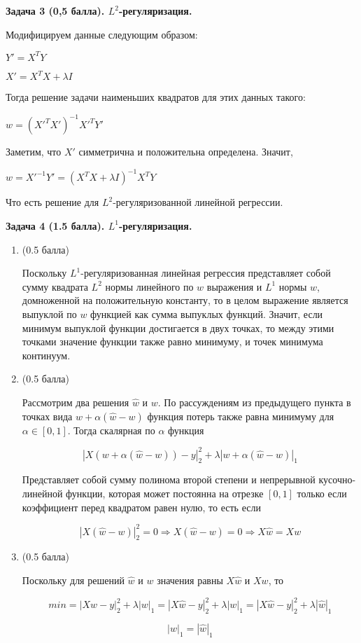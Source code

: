 \documentclass[10pt]{article}
\begin{document}
	
	
	\bigskip
	
	
	
	\textbf{Задача 3 (0,5 балла). $L^2$-регуляризация.}
	
	
	Модифицируем данные следующим образом: 
	
	\medskip
	$Y' = X^T Y$
	
	$X' = X^T X + \lambda I$
	
	\medskip	
	Тогда решение задачи наименьших квадратов для этих данных такого:
	
	$w = (X'^T X')^{-1}X'^T Y'$
	
	Заметим, что $X'$ симметрична и положительна определена. Значит,
	\medskip
	
	$w = X'^{-1}Y' = (X^T X + \lambda I)^{-1}X^T Y$
	
	\medskip
	Что есть решение для $L^2$-регуляризованной линейной регрессии.
	\bigskip
	
	
	\textbf{Задача 4 (1.5 балла). $L^1$-регуляризация.}
	
	
	\begin{enumerate}
		\item{(0.5 балла)} 
		
		Поскольку $L^1$-регуляризованная линейная регрессия представляет собой сумму квадрата $L^2$ нормы линейного по $w$ выражения и $L^1$ нормы $w$, домноженной на положительную константу, то в целом выражение является выпуклой по $w$ функцией как сумма выпуклых функций. Значит, если минимум выпуклой функции достигается в двух точках, то между этими точками значение функции также равно минимуму, и точек минимума континуум.
		
		\item{(0.5 балла)} 
		
		Рассмотрим два решения $\widehat{w}$ и $w$. По рассуждениям из предыдущего пункта в точках вида $w + \alpha(\widehat{w} - w)$ функция потерь также равна минимуму для $\alpha \in [0, 1]$. Тогда скалярная по $\alpha$ функция
		
		$$|X(w + \alpha(\widehat{w} - w)) -y |_2^2 + \lambda |w + \alpha(\widehat{w} - w)|_1$$
		
		Представляет собой сумму полинома второй степени и непрерывной кусочно-линейной функции, которая может постоянна на отрезке $[0,1]$ только если коэффициент перед квадратом равен нулю, то есть если
		
		$$|X(\widehat{w} - w)|^2_2 = 0 \Rightarrow X(\widehat{w} - w) = 0 \Rightarrow X\widehat{w} = Xw$$
		
		\item{(0.5 балла)} 
		
		Поскольку для решений $\widehat{w}$ и $w$ значения равны $X\widehat{w}$  и $Xw$, то
		
		$$ min = |Xw -y |_2^2 + \lambda |w|_1 = |X\widehat{w} -y |_2^2 + \lambda |w|_1 = |X\widehat{w} -y |_2^2 + \lambda |\widehat{w}|_1$$
		
		$$ |w|_1 = |\widehat{w}|_1 $$
	\end{enumerate}
	\bigskip
	
\end{document}
